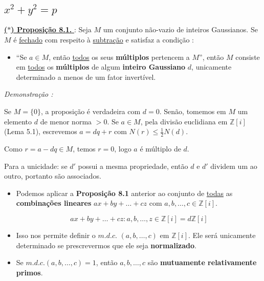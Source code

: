 \subsection{$x^2 + y^2 = p$}

    \underline{\underline{ \textbf{\textcolor{cinzaEscuro}{($\ast$) Proposição 8.1.}} }} : 
    Seja $M$ um conjunto não-vazio de inteiros Gaussianos.  
    Se $M$ é \underline{fechado} com respeito à \underline{subtração} e satisfaz a condição :  

    \begin{itemize}[left=0.5cm, align=left, nosep]
        \item “Se $a \in M$, então \underline{todos} os seus \textbf{múltiplos} pertencem a $M$”,  
        então $M$ consiste em \underline{todos} os \textbf{múltiplos} de algum \textbf{inteiro Gaussiano} $d$, unicamente determinado a menos de um fator invertível.
    \end{itemize}

    \textit{Demonstração : }

    Se $M=\{0\}$, a proposição é verdadeira com $d=0$.  
    Senão, tomemos em $M$ um elemento $d$ de menor norma $>0$.  
    Se $a\in M$, pela divisão euclidiana em $\mathbb{Z}[i]$ (Lema 5.1), 
    escrevemos $a = dq + r$ com $N(r) \leq \tfrac{1}{2}N(d)$.  

    Como $r = a - dq \in M$, temos $r=0$, logo $a$ é múltiplo de $d$.  

    Para a unicidade: se $d'$ possui a mesma propriedade, então $d$ e $d'$ dividem um ao outro, 
    portanto são associados.

    \begin{itemize}[left=0.5cm, align=left, nosep]
        \item Podemos aplicar a \textbf{Proposição 8.1} anterior ao conjunto de \underline{todas} as \textbf{combinações lineares} 
        $ax + by + \ldots + cz$ com $a,b,\dots,c \in \mathbb{Z}[i]$.  
        
        \[
        ax+ by + \ldots + cz : a,b,\ldots,z \in \mathbb{Z}[i] = d\mathbb{Z}[i]
        \]

        \item Isso nos permite definir o $m.d.c.$ $(a,b,\ldots,c)$ em $\mathbb{Z}[i]$.  
        Ele será unicamente determinado se prescrevermos que ele seja \textbf{normalizado}.

        \item Se $m.d.c.(a,b,\ldots,c) = 1$, então $a, b, \ldots , c$ são \textbf{mutuamente relativamente primos}.
    \end{itemize}

